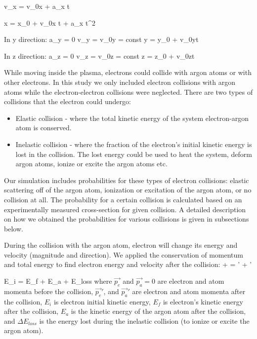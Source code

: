 \documentclass[12pt]{article}
\begin{document}
\beqn
v_x = v_{0x} + a_x t
\label{Initial VelocityX}
\eeqn

\beqn
x = x_0 + v_{0x} t +  a_x t^2
\label{Initial Position}
\eeqn

In y direction:
\beqn
a_y = 0 \rightarrow v_y = v_{0y} = const \rightarrow y = y_0 + v_{0y}t
\label{Initial VelocityY}
\eeqn

In z direction:
\beqn
a_z = 0 \rightarrow v_z = v_{0z} = const \rightarrow z = z_0 + v_{0z}t
\label{Initial VelocityZ}
\eeqn

While moving inside the plasma, electrons could collide with argon atoms or with other electrons. In this study we only included electron collisions with argon atoms while the electron-electron collisions were neglected. There are two types of collisions that the electron could undergo:
\begin{itemize}
\item Elastic collision - where the total kinetic energy of the system electron-argon atom is conserved.
\item Inelastic collision - where the fraction of the electron's initial kinetic energy is lost in the collision. The lost energy could be used to heat the system, deform argon atoms, ionize or excite the argon atoms etc.
\end{itemize}
Our simulation includes probabilities for these types of electron collisions: elastic scattering off of the argon atom, ionization or excitation of the argon atom, or no collision at all. The probability for a certain collision is calculated based on an experimentally measured cross-section for given collision. A detailed description on how we obtained the probabilities for various collisions is given in subsections below.

During the collision with the argon atom, electron will change its energy and velocity (magnitude and direction). We applied the conservation of momentum and total energy to find electron energy and velocity after the collision:
\beqn
{} +  = ' +  ' 
\label{conserve momentum p}
\eeqn

\beqn
E_i = E_f + E_a + \Delta E_{loss}
\label{coserve energy E}
\eeqn
where $\vec{p_e}$ and $\vec{p_a}=0$ are electron and atom momenta before the collision, $\vec{p_e}'$, and $\vec{p_a}'$ are electron and atom momenta after the collision, $E_i$ is electron initial kinetic energy, $E_f$ is electron's kinetic energy after the collision, $E_a$ is the kinetic energy of the argon atom after the collision, and $\Delta E_{loss}$ is the energy lost during the inelastic collision (to ionize or excite the argon atom). 
\end{document}
